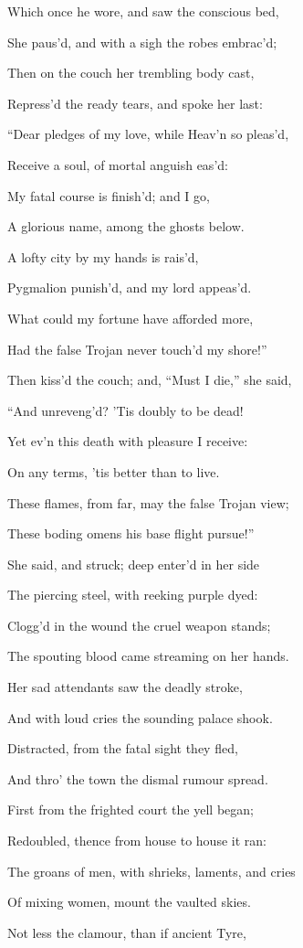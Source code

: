 Which once he wore, and saw the conscious bed,

She paus’d, and with a sigh the robes embrac’d;

Then on the couch her trembling body cast,

Repress’d the ready tears, and spoke her last:

“Dear pledges of my love, while Heav’n so pleas’d,

Receive a soul, of mortal anguish eas’d:

My fatal course is finish’d; and I go,

A glorious name, among the ghosts below.

A lofty city by my hands is rais’d,

Pygmalion punish’d, and my lord appeas’d.

What could my fortune have afforded more,

Had the false Trojan never touch’d my shore!”

Then kiss’d the couch; and, “Must I die,” she said,

“And unreveng’d? ’Tis doubly to be dead!

Yet ev’n this death with pleasure I receive:

On any terms, ’tis better than to live.

These flames, from far, may the false Trojan view;

These boding omens his base flight pursue!”

She said, and struck; deep enter’d in her side

The piercing steel, with reeking purple dyed:

Clogg’d in the wound the cruel weapon stands;

The spouting blood came streaming on her hands.

Her sad attendants saw the deadly stroke,

And with loud cries the sounding palace shook.

Distracted, from the fatal sight they fled,

And thro’ the town the dismal rumour spread.

First from the frighted court the yell began;

Redoubled, thence from house to house it ran:

The groans of men, with shrieks, laments, and cries

Of mixing women, mount the vaulted skies.

Not less the clamour, than if ancient Tyre,

